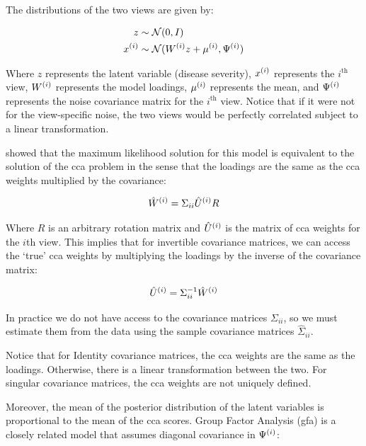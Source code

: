 The distributions of the two views are given by:

\begin{align}
    z& \sim \mathcal{N}(0, I)\\
    x^{(i)} & \sim \mathcal{N}(W^{(i)} z + \mu^{(i)}, \Psi^{(i)})
\end{align}

Where \(z\) represents the latent variable (disease severity), \(x^{(i)}\) represents the $i^{\text{th}}$ view, \(W^{(i)}\) represents the model loadings, \(\mu^{(i)}\) represents the mean, and \(\Psi^{(i)}\) represents the noise covariance matrix for the $i^{\text{th}}$ view.
Notice that if it were not for the view-specific noise, the two views would be perfectly correlated subject to a linear transformation.

\citep{bach2005probabilistic} showed that the maximum likelihood solution for this model is equivalent to the solution of the \acrshort{cca} problem in the sense that the \gls{loadings} are the same as the \acrshort{cca} weights multiplied by the covariance:

\begin{align}\label{eq:probabilistic-cca}
    \hat{W}^{(i)} = \Sigma_{ii} \hat{U}^{(i)} R
\end{align}

Where $R$ is an arbitrary rotation matrix and $\hat{U}^{(i)}$ is the matrix of \acrshort{cca} weights for the $i$th view.
This implies that for invertible covariance matrices, we can access the `true' \acrshort{cca} weights by multiplying the \gls{loadings} by the inverse of the covariance matrix:

\begin{align}
    \hat{U}^{(i)} = \Sigma_{ii}^{-1} \hat{W}^{(i)}
\end{align}

In practice we do not have access to the covariance matrices $\Sigma_{ii}$, so we must estimate them from the data using the sample covariance matrices $\hat{\Sigma}_{ii}$.

Notice that for Identity covariance matrices, the \acrshort{cca} weights are the same as the loadings.
Otherwise, there is a linear transformation between the two.
For singular covariance matrices, the \acrshort{cca} weights are not uniquely defined.

Moreover, the mean of the posterior distribution of the latent variables is proportional to the mean of the \acrshort{cca} scores\citep{klami2013bayesian}.
Group Factor Analysis (\acrshort{gfa}) is a closely related model that assumes diagonal covariance in $\Psi^{(i)}$:

